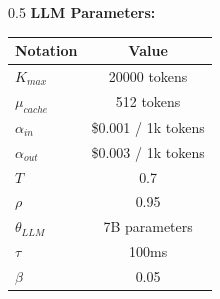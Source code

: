 \begin{frame}[t]
\begin{columns}[t]
\begin{column}{0.5\textwidth}
        \textbf{LLM Parameters:}
        \begin{flushleft}
        {\tiny %
            \begin{tabular}{|l|c|}
            \hline
            \textbf{Notation} & \textbf{Value} \\
            \hline
            $K_{max}$ & 20000 tokens \\
            $\mu_{cache}$ & 512 tokens \\
            $\alpha_{in}$ & \$0.001 / 1k tokens \\
            $\alpha_{out}$ & \$0.003 / 1k tokens \\
            $T$ & 0.7 \\
            $\rho$ & 0.95 \\
            $\theta_{LLM}$ & 7B parameters \\
            $\tau$ & 100ms \\
            $\beta$ & 0.05 \\
            \hline
            \end{tabular}
        }
        \end{flushleft}
    \end{column}

\end{columns}

\vfill
{\tiny %
\hrulefill\\[0.3em]
\textsuperscript{\cite{hu2014automatic}}\\
\textsuperscript{\cite{chen2019automatic}}\\
\textsuperscript{\cite{wang2019tocrwg}}\\
\textsuperscript{\cite{liu2025select}}
}
\end{frame}

